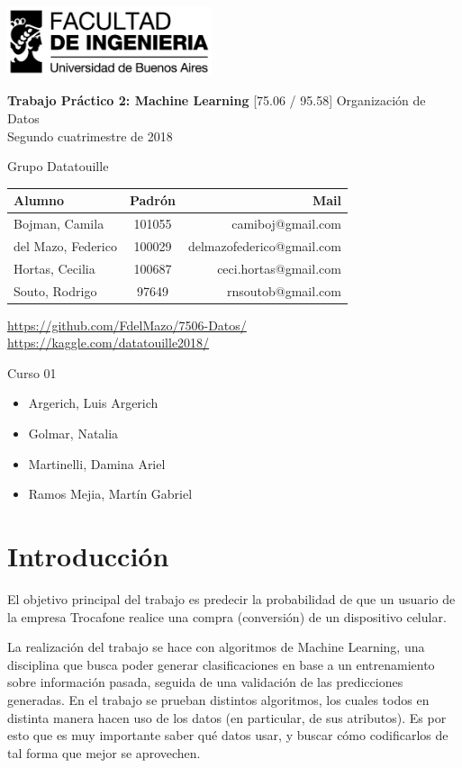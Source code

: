\documentclass[a4paper]{article}
\makeatletter
\newcommand{\materia}{[75.06 / 95.58] Organización de Datos}
\newcommand{\trabajo}{Trabajo Práctico 2: Machine Learning}
\newcommand{\cuatrimestre}{Segundo cuatrimestre de 2018}
\newcommand{\grupo}{Grupo Datatouille}
\newcommand{\repo}{https://github.com/FdelMazo/7506-Datos/}
\newcommand{\kernel}{https://kaggle.com/datatouille2018/}
\newcommand{\alumnos}{
    Bojman, Camila & 101055 &  camiboj@gmail.com\\
    del Mazo, Federico & 100029 & delmazofederico@gmail.com\\
    Hortas, Cecilia & 100687 & ceci.hortas@gmail.com\\
    Souto, Rodrigo & 97649 & rnsoutob@gmail.com\\
}
\newcommand{\curso}{Curso 01}
\newcommand{\docentes}{
    \item Argerich, Luis Argerich
    \item Golmar, Natalia
    \item Martinelli, Damina Ariel
    \item Ramos Mejia, Martín Gabriel
}
\makeatother
\begin{document}

\begin{titlepage}
	\hfill\includegraphics[width=6cm]{fiuba.jpg}
    \begin{center}
    \vfill
    \Huge \textbf{\trabajo}
    \vskip2cm
    \Large \materia\\
    \cuatrimestre
    \vfill
    \begin{flushleft} 
    \grupo
    \end{flushleft}
    \begin{tabular}{|l|c|r|}
	\hline
	Alumno & Padrón & Mail\\
	\hline \hline
    \alumnos
	\hline
	\end{tabular}
    \begin{flushleft} 
    \large{\url{\repo}} \\
    \large{\url{\kernel}} \\
    \end{flushleft}
    \vskip1cm
    \end{center}
    \curso
    \begin{itemize}
        \docentes
    \end{itemize}
\end{titlepage}
\tableofcontents
\newpage
{}
\setcounter{page}{1}

\section{Introducción}

El objetivo principal del trabajo es predecir la probabilidad de que un usuario de la empresa Trocafone realice una compra (conversión) de un dispositivo celular. 

La realización del trabajo se hace con algoritmos de Machine Learning, una disciplina que busca poder generar clasificaciones en base a un entrenamiento sobre información pasada, seguida de una validación de las predicciones generadas. En el trabajo se prueban distintos algoritmos, los cuales todos en distinta manera hacen uso de los datos (en particular, de sus atributos). Es por esto que es muy importante saber qué datos usar, y buscar cómo codificarlos de tal forma que mejor se aprovechen.
\end{document}
